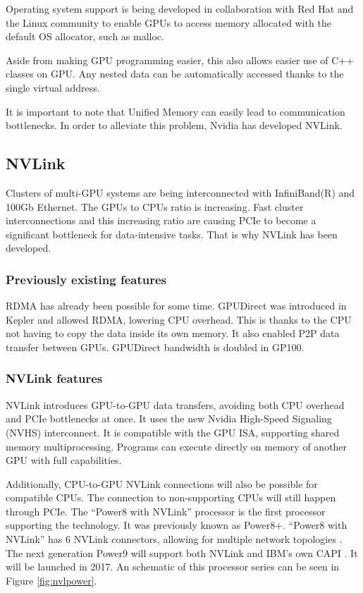 Operating system support is being developed in collaboration with Red Hat and the Linux community to enable GPUs to access memory allocated with the default OS allocator, such as malloc.

Aside from making GPU programming easier, this also allows easier use of C++ classes on GPU.
Any nested data can be automatically accessed thanks to the single virtual address.

It is important to note that Unified Memory can easily lead to communication bottlenecks.
In order to alleviate this problem, Nvidia has developed NVLink.

\subsection{NVLink}

Clusters of multi-GPU systems are being interconnected with InfiniBand(R) and 100Gb Ethernet.
The GPUs to CPUs ratio is increasing.
Fast cluster interconnections and this increasing ratio are causing PCIe to become a significant bottleneck for data-intensive tasks.
That is why NVLink has been developed.

\subsubsection{Previously existing features}
RDMA has already been possible for some time.
GPUDirect was introduced in Kepler and allowed RDMA, lowering CPU overhead.
This is thanks to the CPU not having to copy the data inside its own memory.
It also enabled P2P data transfer between GPUs.
GPUDirect bandwidth is doubled in GP100.
\subsubsection{NVLink features}
NVLink introduces GPU-to-GPU data transfers, avoiding both CPU overhead and PCIe bottlenecks at once.
It uses the new Nvidia High-Speed Signaling (NVHS) interconnect.
It is compatible with the GPU ISA, supporting shared memory multiprocessing.
Programs can execute directly on memory of another GPU with full capabilities.

Additionally, CPU-to-GPU NVLink connections will also be possible for compatible CPUs.
The connection to non-supporting CPUs will still happen through PCIe.
The ``Power8 with NVLink'' processor is the first processor supporting the technology.
It was previously known as Power8+.
``Power8 with NVLink'' has 6 NVLink connectors, allowing for multiple network topologies \cite{openpower:roadmap}.
The next generation Power9 will support both NVLink and IBM's own CAPI \cite{openpower:interconnect2016}.
It will be launched in 2017.
An schematic of this processor series can be seen in Figure \ref{fig:nvlpower}.

